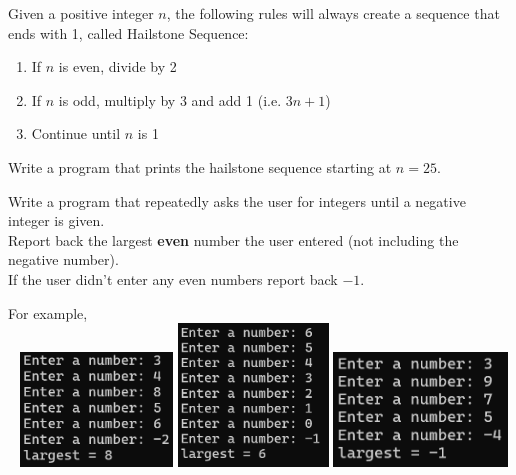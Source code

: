 	\item  
		Given a positive integer $n$, the following rules will always create a sequence that 
		ends with 1, called Hailstone Sequence:
		\begin{enumerate}
			\item If $n$ is even, divide by 2
			\item If $n$ is odd, multiply by 3 and add 1 (i.e. $3n+1$)
			\item Continue until $n$ is 1
		\end{enumerate}
		Write a program that prints the hailstone sequence starting at $n=25$.


	\item  
		Write a program that repeatedly asks the user for integers until a negative integer is 
		given.\\  Report back the largest \textbf{even} number the user entered 
		(not including the negative number).  \\
		If the user didn't enter any even numbers report back $-1$.

		For example, \\ \ \hfill
		\includegraphics[height = 1.2in]{./imgs/largestEven1.PNG} \hfill  
		\includegraphics[height = 1.5in]{./imgs/largestEven2.PNG} \hfill  
		\includegraphics[height = 1.2in]{./imgs/largestEven3.PNG} \hfill \


